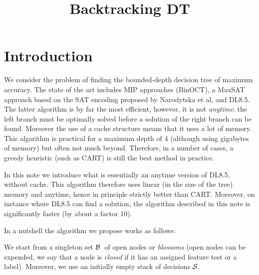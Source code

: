 \documentclass{article}
\title{Backtracking DT}
\newcommand{\nodes}[0]{\ensuremath{{\cal N}}}
\newcommand{\blossom}[0]{\ensuremath{{\cal B}}}
\newcommand{\sequence}[0]{\ensuremath{{\cal S}}}
\begin{document}

\maketitle

\section*{Introduction}

We consider the problem of finding the bounded-depth decision tree of maximum accuracy.
The state of the art includes MIP approaches (BinOCT), a MaxSAT approach based on the SAT encoding proposed by Narodytska et al, and DL8.5.
The latter algorithm is by far the most efficient, however, it is not \emph{anytime}: the left branch must be optimally solved before a solution of the right branch can be found. Moreover the use of a cache structure means that it uses a lot of memory. This algorithm is practical for a maximum depth of 4 (although using gigabytes of memory) but often not much beyond. Therefore, in a number of cases, a greedy heuristic (such as CART) is still the best method in practice.

\medskip

In this note we introduce what is essentially an anytime version of DL8.5, without cache.
This algorithm therefore uses linear (in the size of the tree) memory and anytime, hence in principle strictly better than CART. Moreover, on instance where DL8.5 can find a solution, the algorithm described in this note is significantly faster (by about a factor 10).

\medskip

In a nutshell the algorithm we propose works as follows:



We start from a singleton set \blossom\ of open nodes or \emph{blossoms} (open nodes can be expended, we say that a node is \emph{closed} if it has an assigned feature test or a label). %
Moreover, we use an initially empty stack of decisions $\sequence$.
\end{document}
